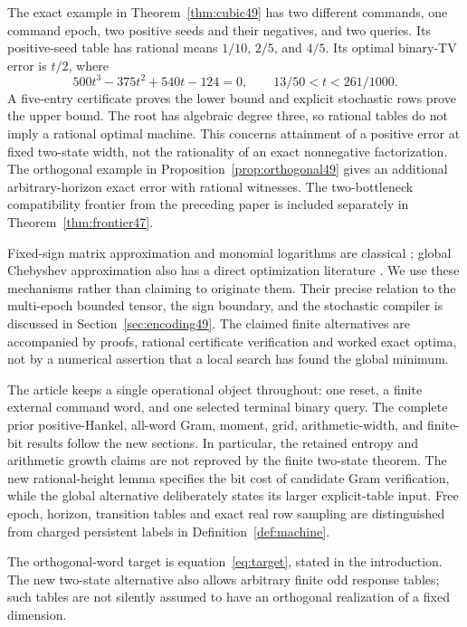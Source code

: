 The exact example in Theorem~\ref{thm:cubic49} has two different
commands, one command epoch, two positive seeds and their negatives,
and two queries. Its positive-seed table has rational means
$1/10$, $2/5$, and $4/5$. Its optimal binary-TV error is $t/2$, where
\[
 500t^3-375t^2+540t-124=0,\qquad 13/50<t<261/1000.
\]
A five-entry certificate proves the lower bound and explicit
stochastic rows prove the upper bound. The root has algebraic degree
three, so rational tables do not imply a rational optimal machine.
This concerns attainment of a positive error at fixed two-state
width, not the rationality of an exact nonnegative factorization.
The orthogonal example in Proposition~\ref{prop:orthogonal49} gives
an additional arbitrary-horizon exact error with rational witnesses.
The two-bottleneck compatibility frontier from the preceding paper
is included separately in Theorem~\ref{thm:frontier47}.

Fixed-sign matrix approximation and monomial logarithms are classical
\cite{GS19,BKVH07}; global Chebyshev approximation also has a direct
optimization literature \cite{MSZ23}. We use these mechanisms rather
than claiming to originate them. Their precise relation to the
multi-epoch bounded tensor, the sign boundary, and the stochastic
compiler is discussed in Section~\ref{sec:encoding49}. The claimed
finite alternatives are accompanied by proofs, rational certificate
verification and worked exact optima, not by a numerical assertion
that a local search has found the global minimum.

The article keeps a single operational object throughout: one reset,
a finite external command word, and one selected terminal binary
query. The complete prior positive-Hankel, all-word Gram, moment,
grid, arithmetic-width, and finite-bit results follow the new
sections. In particular, the retained entropy and arithmetic growth
claims are not reproved by the finite two-state theorem. The new
rational-height lemma specifies the bit cost of candidate Gram
verification, while the global alternative deliberately states its
larger explicit-table input. Free epoch, horizon, transition tables
and exact real row sampling are distinguished from charged persistent
labels in Definition~\ref{def:machine}.

The orthogonal-word target is equation~\eqref{eq:target}, stated in the introduction.
The new two-state alternative also allows arbitrary finite odd response
 tables; such tables are not silently assumed to have an orthogonal
 realization of a fixed dimension.
